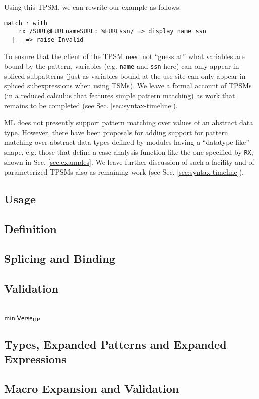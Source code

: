Using this TPSM, we can rewrite our example as follows:
\begin{lstlisting}[numbers=none]
match r with 
    rx /SURL@EURLnameSURL: %EURLssn/ => display name ssn
  | _ => raise Invalid
\end{lstlisting}
To ensure that the client of the TPSM need not ``guess at'' what variables are bound by the pattern, variables (e.g. \lstinline{name} and \lstinline{ssn} here) can only appear in spliced subpatterns (just as variables bound at the use site can only appear in spliced subexpressions when using TSMs). We leave a formal account of TPSMs (in a reduced calculus that features simple pattern matching) as work that remains to be completed (see Sec. \ref{sec:syntax-timeline}).

ML does not presently support pattern matching over values of an abstract data type. However, there have been proposals for adding support for pattern matching over abstract data types defined by modules having a ``datatype-like'' shape, e.g. those that define a case analysis function like the one specified by \lstinline{RX}, shown in Sec. \ref{sec:examples}. We leave further discussion of such a facility and of parameterized TPSMs also as remaining work (see Sec. \ref{sec:syntax-timeline}). 

\subsection{Usage}
\subsection{Definition}
\subsection{Splicing and Binding}
\subsection{Validation}

\section{$\mathsf{miniVerse}_\text{UP}$}
\subsection{Types, Expanded Patterns and Expanded Expressions}
\subsection{Macro Expansion and Validation}
